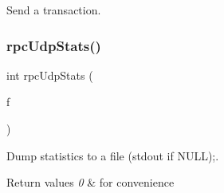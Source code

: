 Send a transaction. \mbox{\label{group__rtems-nfsclient_ga25eec2b7dd88494b276528b6d765ba40}} 
\subsubsection{\texorpdfstring{rpcUdpStats()}{rpcUdpStats()}}
{\footnotesize\ttfamily int rpc\+Udp\+Stats (\begin{DoxyParamCaption}\item[{F\+I\+LE $\ast$}]{f }\end{DoxyParamCaption})}



Dump statistics to a file (stdout if N\+U\+LL);. 


\begin{DoxyRetVals}{Return values}
{\em 0} & for convenience \\
\hline
\end{DoxyRetVals}
